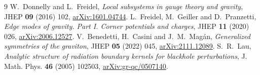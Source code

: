 \documentclass[11pt]{article}
\begin{document}
\begin{thebibliography}{9}
W.~Donnelly and L.~Freidel, \emph{Local subsystems in gauge theory and gravity},
JHEP \textbf{09} (2016) 102, \href{https://arxiv.org/abs/1601.04744}{arXiv:1601.04744}.
L.~Freidel, M.~Geiller and D.~Pranzetti, \emph{Edge modes of gravity. Part I. Corner potentials and charges},
JHEP \textbf{11} (2020) 026, \href{https://arxiv.org/abs/2006.12527}{arXiv:2006.12527}.
V.~Benedetti, H.~Casini and J.~M.~Mag\'an, \emph{Generalized symmetries of the graviton},
JHEP \textbf{05} (2022) 045, \href{https://arxiv.org/abs/2111.12089}{arXiv:2111.12089}.
S.~R.~Lau, \emph{Analytic structure of radiation boundary kernels for blackhole perturbations},
J. Math. Phys. \textbf{46} (2005) 102503, \href{https://arxiv.org/abs/gr-qc/0507140}{arXiv:gr-qc/0507140}.
\end{thebibliography}
\end{document}
